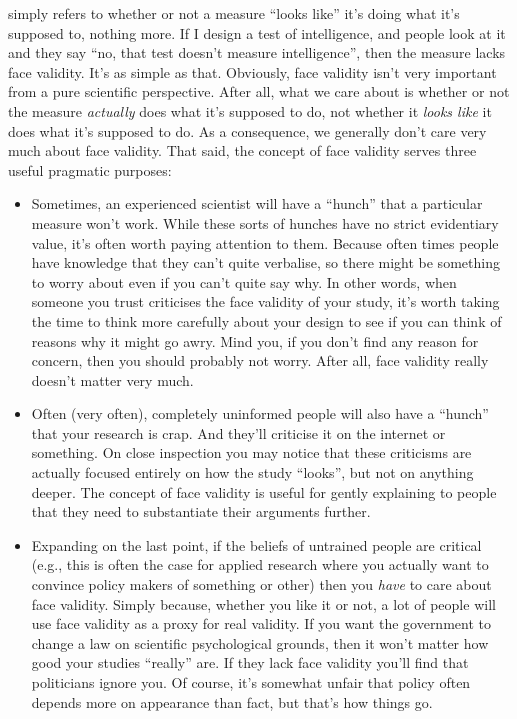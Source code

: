
 simply refers to whether or not a measure ``looks like'' it's doing what it's supposed to, nothing more. If I design a test of intelligence, and people look at it and they say ``no, that test doesn't measure intelligence'', then the measure lacks face validity. It's as simple as that. Obviously, face validity isn't very important from a pure scientific perspective. After all, what we care about is whether or not the measure {\it actually} does what it's supposed to do, not whether it {\it looks like} it does what it's supposed to do. As a consequence, we generally don't care very much about face validity. That said, the concept of face validity serves three useful pragmatic  purposes:
\begin{itemize}
\item Sometimes, an experienced scientist will have a ``hunch'' that a particular measure won't work. While these sorts of hunches have no strict evidentiary value, it's often worth paying attention to them. Because often times people have knowledge that they can't quite verbalise, so there might be something to worry about even if you can't quite say why. In other words, when someone you trust criticises the face validity of your study, it's worth taking the time to think more carefully about your design to see if you can think of reasons why it might go awry. Mind you, if you don't find any reason for concern, then you should probably not worry. After all, face validity really doesn't matter very much.
\item Often (very often), completely uninformed people will also have a ``hunch'' that your research is crap. And they'll criticise it on the internet or something. On close inspection you may notice that these criticisms are actually focused entirely on how the study ``looks'', but not on anything deeper. The concept of face validity is useful for gently explaining to people that they need to substantiate their arguments further. 
\item Expanding on the last point, if the beliefs of untrained people are critical (e.g., this is often the case for applied research where you actually want to convince policy makers of something or other) then you {\it have} to care about face validity. Simply because, whether you like it or not, a lot of people will use face validity as a proxy for real validity. If you want the government to change a law on scientific psychological grounds, then it won't matter how good your studies ``really'' are. If they lack face validity you'll find that politicians ignore you. Of course, it's somewhat unfair that policy often depends more on appearance than fact, but that's how things go.
\end{itemize} 

